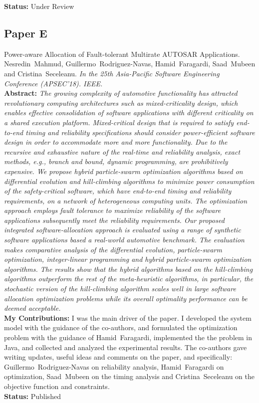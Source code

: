 	\noindent\textbf{Status:} Under Review

\subsection*{Paper E}
Power-aware Allocation of Fault-tolerant Multirate AUTOSAR Applications.
     Nesredin~Mahmud, Guillermo~Rodriguez-Navas, Hamid~Faragardi, Saad~Mubeen and Cristina~Seceleanu. \textit{In the 25th Asia-Pacific Software Engineering Conference (APSEC'18). IEEE.}  
     \label{lbl_softwareallocation_ilp}
\\[6pt]%
\textbf{Abstract:} \textit{The growing complexity of automotive functionality has attracted revolutionary computing architectures such as mixed-criticality design, which enables effective consolidation of software applications with different criticality on a shared execution platform. Mixed-critical design that is required to satisfy end-to-end timing and reliability specifications should consider power-efficient software design in order to accommodate more and more functionality. Due to the recursive and exhaustive nature of the real-time and reliability analysis, exact methods, e.g., branch and bound, dynamic programming, are prohibitively expensive. We propose hybrid particle-swarm optimization algorithms based on differential evolution and hill-climbing algorithms to minimize power consumption of the safety-critical software, which have end-to-end timing and reliability requirements, on a network of heterogeneous computing units. The optimization approach employs fault tolerance to maximize reliability of the software applications subsequently meet the reliability requirements. Our proposed integrated software-allocation approach is evaluated using a range of synthetic software applications based a real-world automotive benchmark. The evaluation makes comparative analysis of the differential evolution, particle-swarm optimization, integer-linear programming and hybrid particle-swarm optimization algorithms. The results show that the hybrid algorithms based on the hill-climbing algorithms outperform the rest of the meta-heuristic algorithms, in particular, the stochastic version of the hill-climbing algorithm scales well in large software allocation optimization problems while its overall optimality performance can be deemed acceptable.
}\\[6pt]%
\textbf{My Contributions: } I was the main driver of the paper. I developed the system model with the guidance of the co-authors, and formulated the optimization problem with the guidance of Hamid~Faragardi, implemented the the problem in Java, and collected and analyzed the experimental results. The co-authors gave writing updates, useful ideas and comments on the paper, and specifically: Guillermo~Rodriguez-Navas on reliability analysis, Hamid~Faragardi on optimization, Saad~Mubeen on the timing analysis and Cristina~Seceleanu on the objective function and constraints.\\
\textbf{Status:} Published

